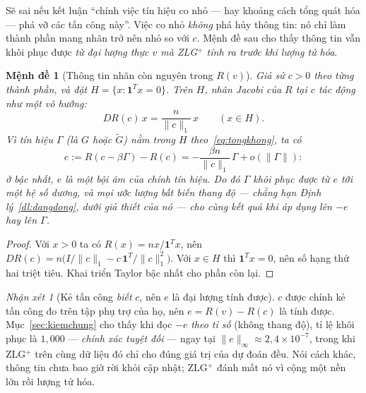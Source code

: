 \documentclass[11pt]{article}
\newtheorem{menhde}[dinhly]{Mệnh đề}
\theoremstyle{remark}
\newtheorem{nhanxet}[dinhly]{Nhận xét}
\newcommand{\one}{\mathbf{1}}
\begin{document}
Sẽ sai nếu kết luận ``chính việc tín hiệu co nhỏ --- hay khoảng cách tổng
quát hóa --- phá vỡ các tấn công này''. Việc co nhỏ \emph{không} phá hủy
thông tin: nó chỉ làm thành phần mang nhãn trở nên nhỏ so với $c$. Mệnh đề
sau cho thấy thông tin vẫn khôi phục được \emph{từ đại lượng thực $v$ mà
ZLG$^+$ tính ra trước khi lượng tử hóa}.

\begin{menhde}[Thông tin nhãn còn nguyên trong $R(v)$]
\label{md:conthongtin}
Giả sử $c>0$ theo từng thành phần, và đặt $H=\{x:\one^Tx=0\}$. Trên $H$,
nhân Jacobi của $R$ tại $c$ tác động như một vô hướng:
\[
 DR(c)\,x = \frac{n}{\|c\|_1}\,x \qquad (x \in H).
\]
Vì tín hiệu $\Gamma$ (là $G$ hoặc $\tilde G$) nằm trong $H$
theo~\eqref{eq:tongkhong}, ta có
\[
 e := R(c-\beta\Gamma) - R(c) = -\frac{\beta n}{\|c\|_1}\,\Gamma + o(\|\Gamma\|):
\]
ở bậc nhất, $e$ là một bội \emph{âm} của chính tín hiệu. Do đó $\Gamma$ khôi
phục được từ $e$ tới một hệ số dương, và mọi ước lượng bất biến thang độ ---
chẳng hạn Định lý~\ref{dl:dangdong}, dưới giả thiết của nó --- cho cùng kết
quả khi áp dụng lên $-e$ hay lên $\Gamma$.
\end{menhde}

\begin{proof}
Với $x>0$ ta có $R(x) = n x/\one^Tx$, nên
$DR(c) = n\bigl(I/\|c\|_1 - c\,\one^T/\|c\|_1^2\bigr)$. Với $x\in H$ thì
$\one^Tx = 0$, nên số hạng thứ hai triệt tiêu. Khai triển Taylor bậc nhất cho
phần còn lại.
\end{proof}

\begin{nhanxet}[Kẻ tấn công \emph{biết} $c$, nên $e$ là đại lượng tính được]
\label{nx:doclaiti}
$c$ được chính kẻ tấn công đo trên tập phụ trợ của họ, nên $e = R(v)-R(c)$ là
tính được. Mục~\ref{sec:kiemchung} cho thấy khi đọc $-e$ \emph{theo tỉ số}
(không thang độ), tỉ lệ khôi phục là $1{,}000$ --- \emph{chính xác tuyệt
đối} --- ngay tại $\|e\|_\infty \approx 2{,}4\times10^{-7}$, trong khi
ZLG$^+$ trên cùng dữ liệu đó chỉ cho đúng giá trị của dự đoán đều. Nói cách
khác, thông tin chưa bao giờ rời khỏi cập nhật; ZLG$^+$ đánh mất nó vì cộng
một nền lớn rồi lượng tử hóa.
\end{nhanxet}
\end{document}
